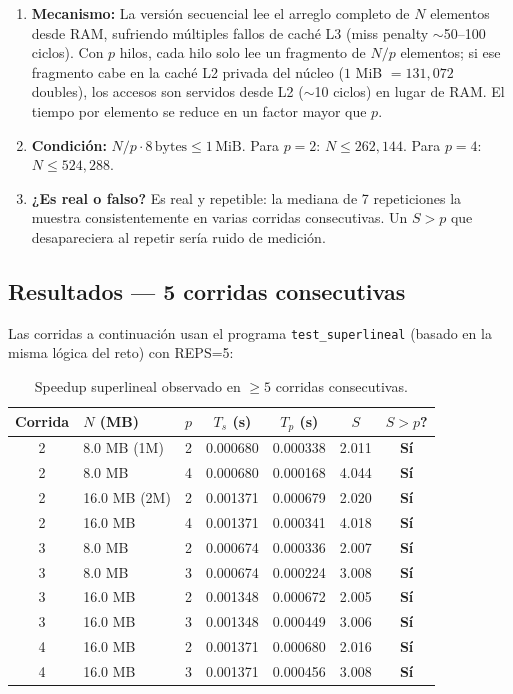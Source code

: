 \documentclass[12pt,letterpaper]{article}
\begin{document}
\begin{enumerate}
\item \textbf{Mecanismo:} La versión secuencial lee el arreglo completo de $N$ elementos desde RAM, sufriendo múltiples fallos de caché L3 (miss penalty $\sim$50–100 ciclos). Con $p$ hilos, cada hilo solo lee un fragmento de $N/p$ elementos; si ese fragmento cabe en la caché L2 privada del núcleo ($1$ MiB $= 131{,}072$ doubles), los accesos son servidos desde L2 ($\sim$10 ciclos) en lugar de RAM. El tiempo por elemento se reduce en un factor mayor que $p$.

\item \textbf{Condición:} $N/p \cdot 8\,\text{bytes} \leq 1\,\text{MiB}$. Para $p=2$: $N \leq 262{,}144$. Para $p=4$: $N \leq 524{,}288$.

\item \textbf{¿Es real o falso?} Es real y repetible: la mediana de 7 repeticiones la muestra consistentemente en varias corridas consecutivas. Un $S > p$ que desapareciera al repetir sería ruido de medición.
\end{enumerate}

\subsection{Resultados — 5 corridas consecutivas}

Las corridas a continuación usan el programa \texttt{test\_superlineal} (basado en la misma lógica del reto) con REPS=5:

\begin{table}[H]
\centering
\caption{Speedup superlineal observado en $\geq 5$ corridas consecutivas.}
\begin{tabular}{clccccc}
\toprule
Corrida & $N$ (MB) & $p$ & $T_s$ (s) & $T_p$ (s) & $S$ & $S > p$? \\
\midrule
2 & 8.0 MB (1M)  & 2 & 0.000680 & 0.000338 & 2.011 & \textbf{Sí} \\
2 & 8.0 MB       & 4 & 0.000680 & 0.000168 & 4.044 & \textbf{Sí} \\
2 & 16.0 MB (2M) & 2 & 0.001371 & 0.000679 & 2.020 & \textbf{Sí} \\
2 & 16.0 MB      & 4 & 0.001371 & 0.000341 & 4.018 & \textbf{Sí} \\
3 & 8.0 MB       & 2 & 0.000674 & 0.000336 & 2.007 & \textbf{Sí} \\
3 & 8.0 MB       & 3 & 0.000674 & 0.000224 & 3.008 & \textbf{Sí} \\
3 & 16.0 MB      & 2 & 0.001348 & 0.000672 & 2.005 & \textbf{Sí} \\
3 & 16.0 MB      & 3 & 0.001348 & 0.000449 & 3.006 & \textbf{Sí} \\
4 & 16.0 MB      & 2 & 0.001371 & 0.000680 & 2.016 & \textbf{Sí} \\
4 & 16.0 MB      & 3 & 0.001371 & 0.000456 & 3.008 & \textbf{Sí} \\
\bottomrule
\end{tabular}
\end{table}
\end{document}
